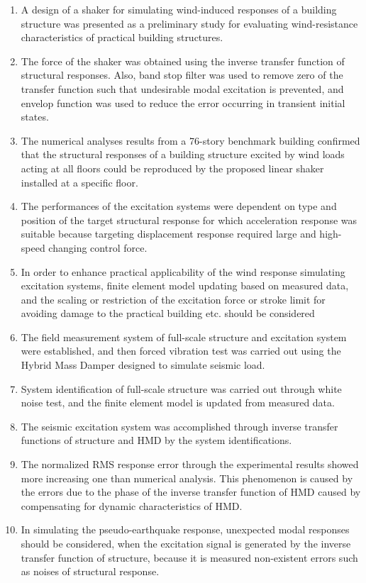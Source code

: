 \begin{enumerate}
\item A design of a shaker for simulating wind-induced responses of a building structure was presented as a preliminary study for evaluating wind-resistance characteristics of practical building structures.
\item The force of the shaker was obtained using the inverse transfer function of structural responses. Also, band stop filter was used to remove zero of the transfer function such that undesirable modal excitation is prevented, and envelop function was used to reduce the error occurring in transient initial states. 
\item The numerical analyses results from a 76-story benchmark building confirmed that the structural responses of a building structure excited by wind loads acting at all floors could be reproduced by the proposed linear shaker installed at a specific floor.
\item The performances of the excitation systems were dependent on type and position of the target structural response for which acceleration response was suitable because targeting displacement response required large and high-speed changing control force.
\item In order to enhance practical applicability of the wind response simulating excitation systems, finite element model updating based on measured data, and the scaling or restriction of the excitation force or stroke limit for avoiding damage to the practical building etc. should be considered
\item The field measurement system of full-scale structure and excitation system were established, and then forced vibration test was carried out using the Hybrid Mass Damper designed to simulate seismic load.
\item System identification of full-scale structure was carried out through white noise test, and the finite element model is updated from measured data. 
\item The seismic excitation system was accomplished through inverse transfer functions of structure and HMD by the system identifications.
\item The normalized RMS response error through the experimental results showed more increasing one than numerical analysis. This phenomenon is caused by the errors due to the phase of the inverse transfer function of HMD caused by compensating for dynamic characteristics of HMD.
\item In simulating the pseudo-earthquake response, unexpected modal responses should be considered, when the excitation signal is generated by the inverse transfer function of structure, because it is measured non-existent errors such as noises of structural response.

\end{enumerate}
